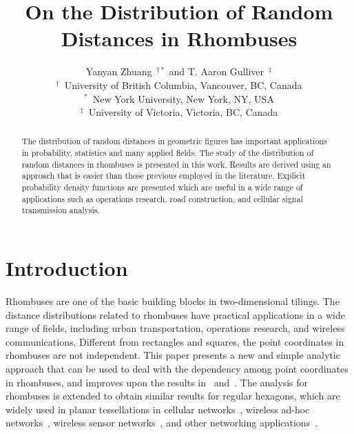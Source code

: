 \documentclass[12pt,draftclsnofoot,onecolumn]{IEEEtran}
\begin{document}
\title{On the Distribution of Random\\Distances in Rhombuses}

\author{Yanyan Zhuang~$^{\dagger *}$ and T. Aaron Gulliver~$^\ddagger$\\
$^\dagger$~University of British Columbia, Vancouver, BC, Canada\\
$^*$~New York University, New York, NY, USA\\
$^\ddagger$~University of Victoria, Victoria, BC, Canada}

\maketitle
\thispagestyle{empty}

\begin{abstract}
The distribution of random distances in geometric figures has important
applications in probability, statistics and many applied fields.
The study of the distribution of random distances in rhombuses is presented in this work.
Results are derived using an approach that is easier than those previous employed in the literature.
Explicit probability density functions are presented which are useful in a wide range of applications
such as operations research, road construction, and cellular signal transmission analysis.
\end{abstract}

\section{Introduction}
Rhombuses are one of the basic building blocks in two-dimensional tilings. The
distance distributions related to rhombuses have practical applications in a
wide range of fields, including urban transportation, operations research, and wireless communications.
Different from rectangles and squares, the point coordinates in rhombuses are not independent.
This paper presents a new and simple analytic approach that can be used
to deal with the dependency among point coordinates in rhombuses, and improves upon the results in~\cite{zhuang2011random}
and~\cite{zhuang2012geometrical}.
The analysis for rhombuses is extended to obtain similar results for regular hexagons, which
are widely used in planar tessellations in cellular
networks~\cite{zhuang2011geometric}, wireless ad-hoc
networks~\cite{zhuang2013planar}, wireless sensor
networks~\cite{schwiebert2001research, chang2008hexagonal, wang2009analytical},
and other networking applications~\cite{baltzis2012distance}.
\end{document}
